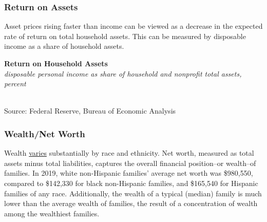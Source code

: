 \documentclass{report}
\makeatletter
\newcommand{\tbllink}[1]{\href{https://raw.githubusercontent.com/bdecon/US-chartbook/master/chartbook/data/#1}{\faTable}}
\newcommand*\short[1]{\expandafter\@gobbletwo\number\numexpr#1\relax}
\newcommand{\dateaxisticks}{
		date coordinates in=x, axis line style={draw=none},
		xmax={2022-03-15},
		max space between ticks=40,	    
		xtick={{1990-01-01}, {1992-01-01}, {1994-01-01}, 
			{1996-01-01}, {1998-01-01}, {2000-01-01}, 
			{2002-01-01}, {2004-01-01}, {2006-01-01},
			{2008-01-01}, {2010-01-01}, {2012-01-01}, {2014-01-01},
		    {2016-01-01}, {2018-01-01}, {2020-01-01}, {2022-01-01}, 
		    {2024-01-01}, {2026-01-01}},
		minor xtick={{1989-01-01}, {1991-01-01}, {1993-01-01},
			{1995-01-01}, {1997-01-01}, {1999-01-01}, 
			{2001-01-01}, {2003-01-01}, {2005-01-01}, {2007-01-01},
		    {2009-01-01}, {2011-01-01}, {2013-01-01}, {2015-01-01},
		    {2017-01-01}, {2019-01-01}, {2021-01-01}, {2023-01-01}, 
		    {2025-01-01}, {2027-01-01}},
		enlarge y limits={0.06}, enlarge x limits={0.01},
		}
\newcommand{\bbar}[2]{extra #1 ticks = {{#2}}, extra #1 tick labels = ,
		extra #1 tick style = {grid=major, grid style={thick, black!25}},}
\newcommand{\stdline}[4]{\addplot[very thick, no markers, color=#1] 
		table [x=#2, y=#3, col sep=comma] {#4};	}
\newcommand{\rbars}{
		\fill[color=black!10] (axis cs:{1990-07-01},\pgfkeysvalueof{/pgfplots/ymin}) rectangle 
			(axis cs:{1991-03-01}, \pgfkeysvalueof{/pgfplots/ymax});
		\fill[color=black!10] (axis cs:{2007-12-01},\pgfkeysvalueof{/pgfplots/ymin}) rectangle 
			(axis cs:{2009-07-01}, \pgfkeysvalueof{/pgfplots/ymax});
		\fill[color=black!10] (axis cs:{2001-03-01},\pgfkeysvalueof{/pgfplots/ymin}) rectangle 
			(axis cs:{2001-11-01}, \pgfkeysvalueof{/pgfplots/ymax});
		\fill[color=black!10] (axis cs:{2020-02-01},\pgfkeysvalueof{/pgfplots/ymin}) rectangle 
			(axis cs:{2020-05-01}, \pgfkeysvalueof{/pgfplots/ymax});}
\makeatother
\begin{document}
{\begin{minipage}{0.76\textwidth}
\subsubsection*{Return on Assets}
\small Asset prices rising faster than income can be viewed as a decrease in the expected rate of return on total household assets. This can be measured by disposable income as a share of household assets.  
\vspace{2mm}

\normalsize \textbf{Return on Household Assets}\\
\footnotesize{\textit{disposable personal income as share of household and nonprofit total assets, percent}}\\
\hspace*{-2mm} \\
\footnotesize{Source: Federal Reserve, Bureau of Economic Analysis} \hfill \tbllink{dpish.csv}
\end{minipage}
\newpage
\begin{minipage}{0.76\textwidth}
\subsubsection*{Wealth/Net Worth}
\small Wealth \href{https://www.federalreserve.gov/econres/notes/feds-notes/disparities-in-wealth-by-race-and-ethnicity-in-the-2019-survey-of-consumer-finances-20200928.htm}{varies} substantially by race and ethnicity. Net worth, measured as total assets minus total liabilities, captures the overall financial position--or wealth--of families. In 2019, white non-Hispanic families' average net worth was \$980,550, compared to \$142,330 for black non-Hispanic families, and \$165,540 for Hispanic families of any race. Additionally, the wealth of a typical (median) family is much lower than the average wealth of families, the result of a concentration of wealth among the wealthiest families.


\end{minipage}}
\end{document}
